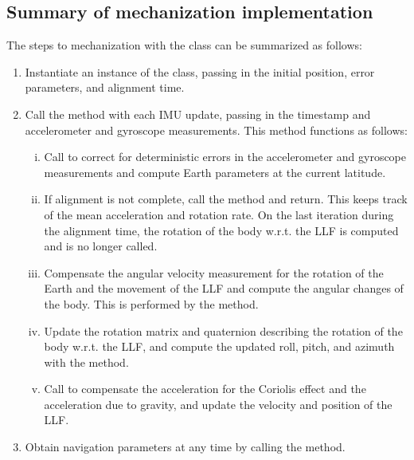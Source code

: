 \documentclass[11pt, oneside]{article}   	%
\begin{document}
\subsection{Summary of mechanization implementation}
The steps to mechanization with the  class can be summarized as follows:
\begin{enumerate}
	\item Instantiate an instance of the  class, passing in the initial position, error parameters, and alignment time.
	\item Call the  method with each IMU update, passing in the timestamp and accelerometer and gyroscope measurements.  This method functions as follows:
	\begin{enumerate}[i.]
		\item Call  to correct for deterministic errors in the accelerometer and gyroscope measurements and compute Earth parameters at the current latitude.
		\item If alignment is not complete, call the  method and return. This keeps track of the mean acceleration and rotation rate. On the last iteration during the alignment time, the rotation of the body w.r.t. the LLF is computed and  is no longer called.
		\item Compensate the angular velocity measurement for the rotation of the Earth and the movement of the LLF and compute the angular changes of the body.  This is performed by the  method.
		\item Update the rotation matrix and quaternion describing the rotation of the body w.r.t. the LLF, and compute the updated roll, pitch, and azimuth with the  method.
		\item Call  to compensate the acceleration for the Coriolis effect and the acceleration due to gravity, and update the velocity and position of the LLF.
	\end{enumerate}
	\item Obtain navigation parameters at any time by calling the  method.
\end{enumerate}
\end{document}

